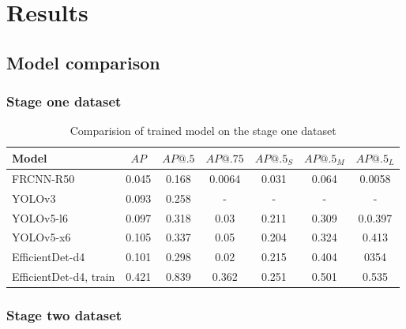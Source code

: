 \chapter{Results}
\label{chapter:results}
\section{Model comparison}
\subsection{Stage one dataset}
\begin{table}[h]
    \centering
    \begin{tabular}{|l|c|c|c|c|c|c|}
        \hline
        Model                  & $AP$  & $AP@.5$ & $AP@.75$ & $AP@.5_S$ & $AP@.5_M$ & $AP@.5_L$ \\ \hline
        FRCNN-R50              & 0.045 & 0.168   & 0.0064   & 0.031     & 0.064     & 0.0058    \\ \hline
        YOLOv3                 & 0.093 & 0.258   & -        & -         & -         & -         \\ \hline
        YOLOv5-l6              & 0.097 & 0.318   & 0.03     & 0.211     & 0.309     & 0.0.397   \\ \hline
        YOLOv5-x6              & 0.105 & 0.337   & 0.05     & 0.204     & 0.324     & 0.413     \\ \hline
        EfficientDet-d4        & 0.101 & 0.298   & 0.02     & 0.215     & 0.404     & 0354      \\ \hline
        EfficientDet-d4, train & 0.421 & 0.839   & 0.362    & 0.251     & 0.501     & 0.535     \\ \hline
    \end{tabular}
    \caption{Comparision of trained model on the stage one dataset}
    \label{tab:model_results:stage_one}
\end{table}

\subsection{Stage two dataset}

